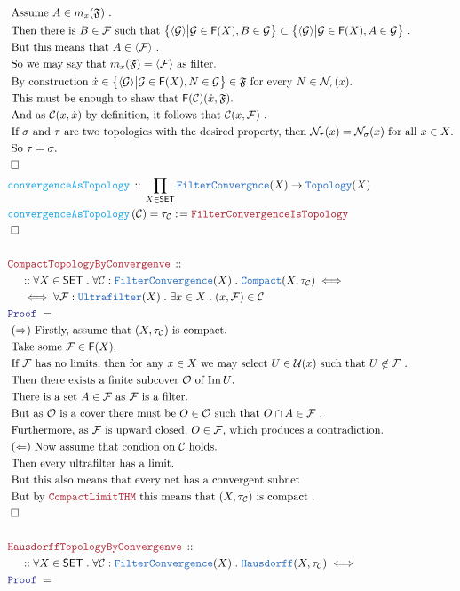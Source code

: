 \documentclass[12pt]{scrartcl}
\newcommand{\TYPE}[1]{\textcolor{NavyBlue}{\mathtt{#1}}}
\newcommand{\FUNC}[1]{\textcolor{Cerulean}{\mathtt{#1}}}
\newcommand{\LOGIC}[1]{\textcolor{Blue}{\mathtt{#1}}}
\newcommand{\THM}[1]{\textcolor{Maroon}{\mathtt{#1}}}
\renewcommand{\.}{\; . \;}
\newcommand{\de}{: \kern 0.1pc =}
\newcommand{\Act}[1]{\left( #1 \right)}
\newcommand{\Theorem}[2]{& \THM{#1} \, :: \, #2 \\ & \Proof = \\ }
\newcommand{\DeclareFunc}[2]{& \FUNC{#1} \, :: \, #2 \\}
\newcommand{\DefineNamedFunc}[4]{&  \FUNC{#1}\Act{#2} = #3 \de #4 \\}
\newcommand{\NewLine}{\\ & \kern 1pc}
\newcommand{\Page}[1]{ \begin{align*} #1 \end{align*}   }
\newcommand{\Explain}[1]{& \text{#1.} \\}
\newcommand{\Imply}{\Rightarrow}
\DeclareMathOperator*{\im}{Im}
\newcommand{\QED}{\; \square}
\newcommand{\EndProof}{& \QED \\}
\newcommand{\Proof}{\LOGIC{Proof} \; }
\newcommand{\C}{\mathcal{C}}
\newcommand{\SET}{\mathsf{SET}}
\newcommand{\Topology}{\TYPE{Topology}}
\newcommand{\Compact}{\TYPE{Compact}}
\newcommand{\FILT}{\mathsf{F}}
\newcommand{\N}{\mathcal{N}}
\newcommand{\U}{\mathcal{U}}
\renewcommand{\O}{\mathcal{O}}
\newcommand{\F}{\mathcal{F}}
\begin{document}
\newpage
\Page{
	\Explain{
	 	Assume $A \in  m_x(\mathfrak{F})$ 
	 }
	 \Explain{
	 	Then there is $B \in \F$ such that 
	 	$
	 		\big\{ \langle \mathcal{G} \rangle \big|\mathcal{G} \in \FILT(X), B \in \mathcal{G} \big\}
	 		\subset  
	 		\big\{ \langle \mathcal{G} \rangle \big|\mathcal{G} \in \FILT(X), A \in \mathcal{G} \big\}
	 	$
	 }
	 \Explain{ But this means that $A \in \langle \F \rangle$ }
	 \Explain{ So we may say that $m_x(\mathfrak{F}) = \langle\F\rangle$ as filter}
	 \Explain{
		By construction 
		$
		\dot x \in \big\{ \langle \mathcal{G} \rangle \big|\mathcal{G} \in \FILT(X), N \in \mathcal{G} \big\} 
		\in 	
		\mathfrak{F}$
		for every $N \in \N_\tau(x)$}
	\Explain{
		This must be enough to shaw that $\FILT(\C)(\dot x, \mathfrak{F})$}
	\Explain{
		And as $\C(x,\dot x)$ by definition, it follows that $\C(x,\F)$
	}
	\Explain{
		If  $\sigma$ and $\tau$ are two topologies with the desired property, 
		then $\N_\tau(x) = \N_\sigma(x)$ for all $x \in X$}
	\Explain{
		So $\tau = \sigma$}
	\EndProof
	\DeclareFunc{convergenceAsTopology}
	{
		\prod_{X \in \SET} \TYPE{FilterConvergnce}(X) \to \Topology(X)
	}
	\DefineNamedFunc{convergenceAsTopology}{\C}{\tau_\C}
	{
		\THM{FilterConvergenceIsTopology}
	} 
	\EndProof
	\\
	\Theorem{CompactTopologyByConvergenve}
	{
		\NewLine ::		
		\forall X \in \SET \.
		\forall \C : \TYPE{FilterConvergence}(X) \.
		\Compact(X,\tau_\C) 
		\iff
		\NewLine
		\iff
		\forall \F : \TYPE{Ultrafilter}(X) \.
		\exists x \in X \.
		(x,  \F) \in \C	
	}
	\Explain{ 
		$(\Imply)$
		Firstly, assume that $(X,\tau_\C)$ is compact}
	\Explain{
		Take some $\F \in \FILT(X)$}
	\Explain{
		If $\F$ has no limits, then for any $x \in X$ we may select
		$U \in \U(x)$ such that $U \not \in \F$		
	}
	\Explain{
		Then there exists a finite subcover $\O$
		of $\im U$}
	\Explain{
		There is a set $A \in \F$ as $\F$ 
		is a filter}
	\Explain{
		But as $\O$ is a cover
		there must be $O \in \O$ such that
		$O \cap A \in \F$
	}
	\Explain{
		Furthermore, as $\F$ is upward closed,
		$O \in \F$, which produces a contradiction}
	\Explain{
		$(\Leftarrow)$ Now assume that condion on $\C$ holds}
	\Explain{
		Then every ultrafilter has a limit}
	\Explain{
		But this also means that every net has a convergent subnet
	}
	\Explain{
		But by $\THM{CompactLimitTHM}$ this means that
		$(X,\tau_\C)$ is compact
	}
	\EndProof
	\\
	\Theorem{HausdorffTopologyByConvergenve}
	{
		\NewLine ::		
		\forall X \in \SET \.
		\forall \C : \TYPE{FilterConvergence}(X) \.
		\TYPE{Hausdorff}(X,\tau_\C) 
		\iff
}}
\end{document}
